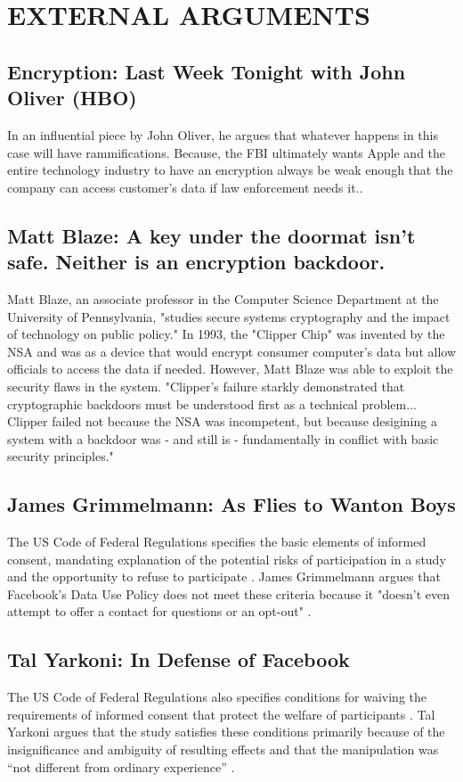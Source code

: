 \section{EXTERNAL ARGUMENTS}
\subsection{Encryption: Last Week Tonight with John Oliver (HBO)}
In an influential piece by John Oliver, he argues that whatever happens in this case will have rammifications. Because, the FBI ultimately wants Apple and the entire technology industry to have an encryption always be weak enough that the company can access customer's data if law enforcement needs it.\cite{John-Oliver}.

\subsection{Matt Blaze: A key under the doormat isn't safe. Neither is an encryption backdoor.}
Matt Blaze, an associate professor in the Computer Science Department at the University of Pennsylvania, "studies secure systems cryptography and the impact of technology on public policy." In 1993, the "Clipper Chip" was invented by the NSA and was as a device that would encrypt consumer computer's data but allow officials to access the data if needed. However, Matt Blaze was able to exploit the security flaws in the system. "Clipper's failure starkly demonstrated that cryptographic backdoors must be understood first as a technical problem... Clipper failed not because the NSA was incompetent, but because desigining a system with a backdoor was - and still is - fundamentally in conflict with basic security principles." \cite{Washington-Blaze}

\subsection{James Grimmelmann: As Flies to Wanton Boys}
The US Code of Federal Regulations specifies the basic elements of informed consent, mandating explanation of the potential risks of participation in a study and the opportunity to refuse to participate \cite{cfrconsent}.  James Grimmelmann argues that Facebook's Data Use Policy does not meet these criteria because it "doesn't even attempt to offer a contact for questions or an opt-out" \cite{laboratorium}.

\subsection{Tal Yarkoni: In Defense of Facebook}
The US Code of Federal Regulations also specifies conditions for waiving the requirements of informed consent that protect the welfare of participants \cite{csrwaive}.  Tal Yarkoni argues that the study satisfies these conditions primarily because of the insignificance and ambiguity of resulting effects \cite{defense} and that the manipulation was “not different from ordinary experience” \cite{defensedefense}.

